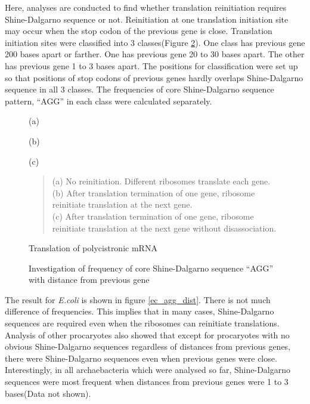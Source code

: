 Here, analyses are conducted to find whether translation reinitiation
requires Shine-Dalgarno sequence or not. Reinitiation at one translation
initiation site may occur when the stop codon of the previous gene is
close. Translation initiation sites were classified into 3
classes(Figure \ref{reinit_inv}). One class has previous gene 200 bases
apart or farther. One has previous gene 20 to 30 bases apart. The other
has previous gene 1 to 3 bases apart. The positions for classification
were set up so that positions of stop codons of previous genes hardly
overlaps Shine-Dalgarno sequence in all 3 classes. The frequencies of
core Shine-Dalgarno sequence pattern, ``AGG'' in each class were
calculated separately.

\begin{figure}
\begin{center}
(a)\\

\vspace{2em}

(b)\\

\vspace{2em}

(c)
\end{center}
\caption{Translation of polycistronic mRNA}
\label{reinit_figure}
\begin{small}
\begin{quotation}
\noindent
(a) No reinitiation. Different ribosomes translate each gene.\\
(b) After translation termination of one gene, ribosome reinitiate translation at the next gene.\\
(c)  After translation termination of one gene, ribosome reinitiate translation at the next gene without disassociation.
\end{quotation}
\end{small}
\end{figure}

\begin{figure}
\begin{center}
\end{center}
\caption{Investigation of frequency of core Shine-Dalgarno sequence ``AGG'' with distance from previous gene}
\label{reinit_inv}
\end{figure}

The result for {\it E.coli} is shown in figure
\ref{ec_agg_dist}. There is not much difference of frequencies. This
implies that in many cases, Shine-Dalgarno sequences are required even
when the ribosomes can reinitiate translations. Analysis of other
procaryotes also showed that except for procaryotes with no obvious
Shine-Dalgarno sequences regardless of distances from previous genes,
there were Shine-Dalgarno sequences even when previous genes were
close. Interestingly, in all archaebacteria which were analysed so far,
Shine-Dalgarno sequences were most frequent when distances from
previous genes were 1 to 3 bases(Data not shown).

